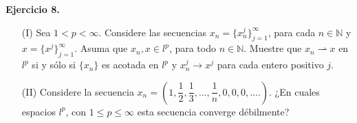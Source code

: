 

\textbf{Ejercicio 8.}

\begin{enumerate}
    \item[(I)] Sea $1<p<\infty$. Considere las secuencias $x_n=\{x_n^j\}_{j=1}^\infty$, para cada $n \in \mathbb{N}$ y $x=\{x^j\}_{j=1}^\infty$. Asuma que $x_n,x\in l^p$, para todo $n \in \mathbb{N}$. Muestre que $x_n\rightharpoonup x$ en $l^p$ si y sólo si $\{x_n\}$ es acotada en $l^p$ y $x_n^j\to x^j$ para cada entero positivo $j$.

    \item[(II)] Considere la secuencia $x_n=\left(1,\dfrac{1}{2},\dfrac{1}{3},...,\dfrac{1}{n},0,0,0,....\right)$. ¿En cuales espacios $l^p$, con $1\leq p\leq \infty$ esta secuencia converge débilmente?
\end{enumerate}

